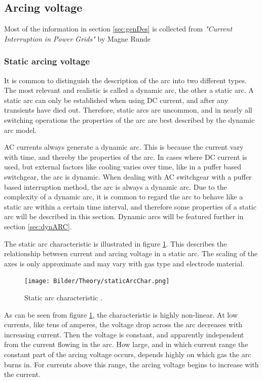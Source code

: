 \documentclass[10pt,b5paper,twoside]{article}
\begin{document}
\newpage
\subsection{Arcing voltage}
Most of the information in section \ref{sec:genDes} is collected from \textit{"Current Interruption in Power Grids"} by Magne Runde \cite{bib:HVEbreak} \newline

\subsubsection{Static arcing voltage} \label{sec:staticArcVoltage}
It is common to distinguish the description of the arc into two different types. The most relevant and realistic is called a dynamic arc, the other a static arc. A static arc can only be established when using DC current, and after any transients have died out. Therefore, static arcs are uncommon, and in nearly all switching operations the properties of the arc are best described by the dynamic arc model.

AC currents always generate a dynamic arc. This is because the current vary with time, and thereby the properties of the arc. In cases where DC current is used, but external factors like cooling varies over time, like in a puffer based switchgear, the arc is dynamic. When dealing with AC switchgear with a puffer based interruption method, the arc is always a dynamic arc. Due to the complexity of a dynamic arc, it is common to regard the arc to behave like a static arc within a certain time interval, and therefore some properties of a static arc will be described in this section. Dynamic arcs will be featured further in section \ref{sec:dynARC}.

The static arc characteristic is illustrated in figure \ref{fig:staticArcChar}. This describes the relationship between current and arcing voltage in a static arc. The scaling of the axes is only approximate and may vary with gas type and electrode material.

\begin{figure}[H]
\centering
\texttt{[image: Bilder/Theory/staticArcChar.png]}
\caption{Static arc characteristic  \cite{bib:HVEbreak}.} \label{fig:staticArcChar}
\end{figure}

As can be seen from figure \ref{fig:staticArcChar}, the characteristic is highly non-linear. At low currents, like tens of amperes, the voltage drop across the arc decreases with increasing current. Then the voltage is constant, and apparently independent from the current flowing in the arc. How large, and in which current range the constant part of the arcing voltage occurs, depends highly on which gas the arc burns in. For currents above this range, the arcing voltage begins to increase with the current.
\end{document}
